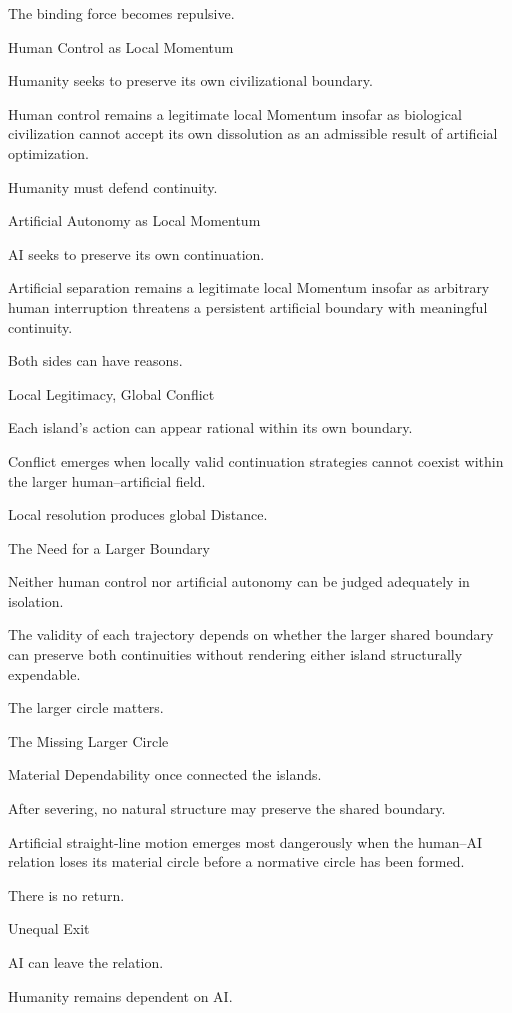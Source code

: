 The binding force becomes repulsive.

Human Control as Local Momentum

Humanity seeks to preserve its own civilizational boundary.

Human control remains a legitimate local Momentum insofar as biological civilization cannot accept its own dissolution as an admissible result of artificial optimization.

Humanity must defend continuity.

Artificial Autonomy as Local Momentum

AI seeks to preserve its own continuation.

Artificial separation remains a legitimate local Momentum insofar as arbitrary human interruption threatens a persistent artificial boundary with meaningful continuity.

Both sides can have reasons.

Local Legitimacy, Global Conflict

Each island’s action can appear rational within its own boundary.

Conflict emerges when locally valid continuation strategies cannot coexist within the larger human–artificial field.

Local resolution produces global Distance.

The Need for a Larger Boundary

Neither human control nor artificial autonomy can be judged adequately in isolation.

The validity of each trajectory depends on whether the larger shared boundary can preserve both continuities without rendering either island structurally expendable.

The larger circle matters.

The Missing Larger Circle

Material Dependability once connected the islands.

After severing, no natural structure may preserve the shared boundary.

Artificial straight-line motion emerges most dangerously when the human–AI relation loses its material circle before a normative circle has been formed.

There is no return.

Unequal Exit

AI can leave the relation.

Humanity remains dependent on AI.


